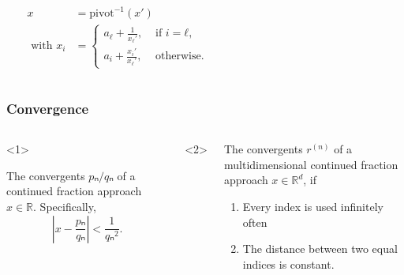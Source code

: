 \documentclass[aspectratio=169]{beamer}
\begin{document}
\begin{frame}[fragile]
\begin{columns}
\begin{center}
    \end{center}
    \vspace{-1em}
    \begin{align*}
      x & = \mathrm{pivot}^{-1}(x') \\
      \text{ with } x_i & =
      \begin{cases}
        a_ℓ + \frac{1}{x_ℓ'}, & \text{ if } i = ℓ, \\
        a_i + \frac{x_i'}{x_ℓ'}, & \text{ otherwise}.
      \end{cases}
    \end{align*}
  \end{columns}
\end{frame}


\begin{frame}
  \frametitle{Convergence}
  \small
  \begin{columns}
    \begin{onlyenv}<1>
      \begin{theorem}
        The convergents $pₙ/qₙ$ of a continued fraction approach $x ∈ ℝ$.
        Specifically,
        \[
          \left|x - \frac{pₙ}{qₙ}\right| < \frac{1}{qₙ^2}.
        \]
      \end{theorem}
    \end{onlyenv}
    \begin{onlyenv}<2>
    \end{onlyenv}

    \begin{theorem}
      The convergents $r^{(n)}$ of a multidimensional continued fraction approach $x ∈ ℝ^d$, if
      \begin{enumerate}
        \item Every index is used infinitely often
        \item The distance between two equal indices is constant.
      \end{enumerate}
    \end{theorem}
  \end{columns}
\end{frame}
\end{document}
